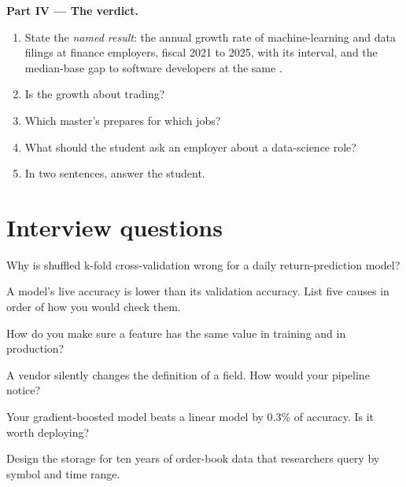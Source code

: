 \begin{problem}
\medskip\noindent\textbf{Part IV --- The verdict.}
\begin{enumerate}[resume]
\item State the \emph{named result}: the annual growth rate of machine-learning and data filings at finance employers,
fiscal 2021 to 2025, with its interval, and the median-base gap to software developers at the same .
\item Is the growth about trading?
\item Which master's prepares for which jobs?
\item What should the student ask an employer about a data-science role?
\item In two sentences, answer the student.
\end{enumerate}
\end{problem}

\section{Interview questions}

\begin{interviewq}\label{iq:in:machine-learning-and-data-engineer:1}
Why is shuffled k-fold cross-validation wrong for a daily return-prediction model?
\end{interviewq}

\begin{interviewq}\label{iq:in:machine-learning-and-data-engineer:2}
A model's live accuracy is lower than its validation accuracy. List five causes in order of how you would check them.
\end{interviewq}

\begin{interviewq}\label{iq:in:machine-learning-and-data-engineer:3}
How do you make sure a feature has the same value in training and in production?
\end{interviewq}

\begin{interviewq}\label{iq:in:machine-learning-and-data-engineer:4}
A vendor silently changes the definition of a field. How would your pipeline notice?
\end{interviewq}

\begin{interviewq}\label{iq:in:machine-learning-and-data-engineer:5}
Your gradient-boosted model beats a linear model by 0.3\% of accuracy. Is it worth deploying?
\end{interviewq}

\begin{interviewq}\label{iq:in:machine-learning-and-data-engineer:6}
Design the storage for ten years of order-book data that researchers query by symbol and time range.
\end{interviewq}
